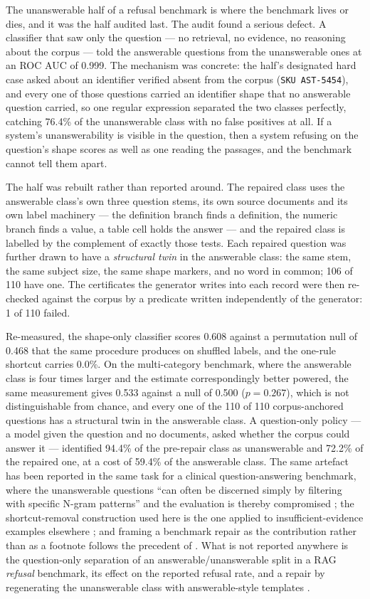 \documentclass[preprint,3p,times]{elsarticle}
\begin{document}
The unanswerable half of a refusal benchmark is where the benchmark lives or
dies, and it was the half audited last. The audit found a serious defect. A
classifier that saw only the question --- no retrieval, no evidence, no
reasoning about the corpus --- told the answerable questions from the
unanswerable ones at an ROC AUC of 0.999. The mechanism was
concrete: the half's designated hard case asked about an identifier verified
absent from the corpus (\texttt{SKU AST-5454}), and every one of those
questions carried an identifier shape that no answerable question carried, so
one regular expression separated the two classes perfectly, catching
76.4\% of the unanswerable class with no false positives at
all. If a system's unanswerability is visible in the question, then a system
refusing on the question's shape scores as well as one reading the passages,
and the benchmark cannot tell them apart.

The half was rebuilt rather than reported around. The repaired class uses the
answerable class's own three question stems, its own source documents and its
own label machinery --- the definition branch finds a definition, the numeric
branch finds a value, a table cell holds the answer --- and the repaired class
is labelled by the complement of exactly those tests. Each repaired question
was further drawn to have a \emph{structural twin} in the answerable class:
the same stem, the same subject size, the same shape markers, and no word in
common; 106 of 110 have one. The certificates the generator
writes into each record were then re-checked against the corpus by a predicate
written independently of the generator: 1 of 110 failed.

Re-measured, the shape-only classifier scores 0.608 against a
permutation null of 0.468
 that the same procedure produces on
shuffled labels, and the one-rule shortcut carries 0.0\%. On
the multi-category benchmark, where the answerable class is four times larger
and the estimate correspondingly better powered, the same measurement gives
0.533 against a null of 0.500
($p = 0.267$), which is not distinguishable from chance, and every
one of the 110 of 110 corpus-anchored questions has a structural twin
in the answerable class. A
question-only policy --- a model given the question and no documents, asked
whether the corpus could answer it --- identified
94.4\% of the pre-repair class as unanswerable and
72.2\% of the repaired one, at a cost of
59.4\% of the answerable class.
The same artefact has been reported in the same task for a clinical question-answering benchmark, where the unanswerable questions ``can often be discerned simply by filtering with specific N-gram patterns'' and the evaluation is thereby compromised \cite{yang2024ehrsql}; the shortcut-removal construction used here is the one applied to insufficient-evidence examples elsewhere \cite{mondal2026beforeanswering}; and framing a benchmark repair as the contribution rather than as a footnote follows the precedent of \cite{brunello2026folio}. What is not reported anywhere is the question-only separation of an answerable/unanswerable split in a RAG \emph{refusal} benchmark, its effect on the reported refusal rate, and a repair by regenerating the unanswerable class with answerable-style templates \cite{gautam2023unanswerable}.
\end{document}
